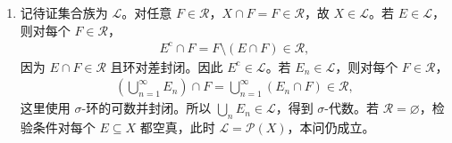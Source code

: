 \documentclass[../../main.tex]{subfiles}%
\begin{document}
\begin{solution}
\begin{enumerate}[label=\alph*.,ref=(\alph*)]
设 $E_n\in\mathscr{S}$，令 $G=\bigcup_nE_n$。若所有 $E_n$ 都在 $\mathscr{R}$ 中，则 $G\in\mathscr{R}\subseteq\mathscr{S}$。否则存在 $k$ 使 $E_k\notin\mathscr{R}$，于是 $C=E_k^{\mathrm c}\in\mathscr{R}$。对每个 $n$，若 $E_n\in\mathscr{R}$，则 $C\cap E_n^{\mathrm c}=C\setminus E_n\in\mathscr{R}$；若 $E_n\notin\mathscr{R}$，则 $E_n^{\mathrm c}\in\mathscr{R}$，由已证交封闭也得 $C\cap E_n^{\mathrm c}\in\mathscr{R}$。因此由本解答的\hyperref[item:ch01-rings-solution-intersections]{可数交结论}，
\begin{align*}
G^{\mathrm c}=\bigcap_{n=1}^{\infty}(C\cap E_n^{\mathrm c})\in\mathscr{R}.
\end{align*}
这里左侧已包含于 $C=E_k^{\mathrm c}$，所以加上 $C$ 不改变交。故 $G\in\mathscr{S}$。非空、补封闭、可数并封闭全部成立，$\mathscr{S}$ 为 $\sigma$-代数。若允许 $\mathscr{R}=\varnothing$，则本问按原字面失败，反例已在上方说明，不能给出相反结论的证明。
\item\label{item:ch01-rings-solution-localization} 记待证集合族为 $\mathscr{L}$。对任意 $F\in\mathscr{R}$，$X\cap F=F\in\mathscr{R}$，故 $X\in\mathscr{L}$。若 $E\in\mathscr{L}$，则对每个 $F\in\mathscr{R}$，
\begin{align*}
E^{\mathrm c}\cap F=F\setminus(E\cap F)\in\mathscr{R},
\end{align*}
因为 $E\cap F\in\mathscr{R}$ 且环对差封闭。因此 $E^{\mathrm c}\in\mathscr{L}$。若 $E_n\in\mathscr{L}$，则对每个 $F\in\mathscr{R}$，
\begin{align*}
\left(\bigcup_{n=1}^{\infty}E_n\right)\cap F
=\bigcup_{n=1}^{\infty}(E_n\cap F)\in\mathscr{R},
\end{align*}
这里使用 $\sigma$-环的可数并封闭。所以 $\bigcup_nE_n\in\mathscr{L}$，得到 $\sigma$-代数。若 $\mathscr{R}=\varnothing$，检验条件对每个 $E\subseteq X$ 都空真，此时 $\mathscr{L}=\mathscr{P}(X)$，本问仍成立。
\end{enumerate}
\end{solution}
\end{document}
